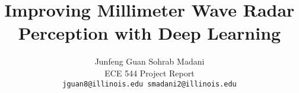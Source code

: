 \documentclass[10pt,twocolumn,letterpaper]{article}
\begin{document}
\title{Improving Millimeter Wave Radar Perception with Deep Learning}

\author{Junfeng Guan \hspace{2cm} Sohrab Madani\\
ECE 544 Project Report\\
{\tt\small jguan8@illinois.edu  \hspace{2cm} smadani2@illinois.edu}
}

\maketitle










{\small


}
\end{document}

